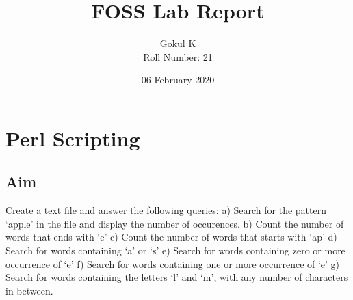 \documentclass{article}
\begin{document}
\title{FOSS Lab Report}
\author{Gokul K\\[2\baselineskip]
Roll Number: 21\\[2\baselineskip]}
\date{06 February 2020}

\maketitle

\setcounter{section}{18}
\section{Perl Scripting}
\subsection{Aim}
Create a text file and answer the following queries:\newline
	a) Search for the pattern ‘apple’ in the file and display
  the number of occurences.\newline
	b) Count the number of words that ends with ‘e’\newline
	c) Count the number of words that starts with ‘ap’\newline
	d) Search for words containing ‘a’ or ‘s’\newline
	e) Search for words containing zero or more occurrence of ‘e’\newline
	f) Search for words containing one or more occurrence of ‘e’\newline
	g) Search for words containing the letters ‘l’ and ‘m’, with 
	any number of characters in between.
\end{document}
